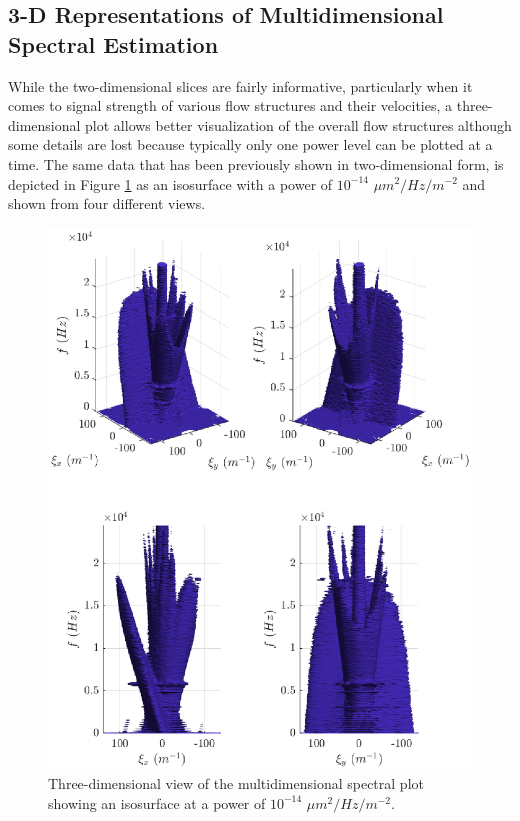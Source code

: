 \subsection{3-D Representations of Multidimensional Spectral Estimation}
While the two-dimensional slices are fairly informative, particularly when it comes to signal strength of various flow structures and their velocities, a three-dimensional plot allows better visualization of the overall flow structures although some details are lost because typically only one power level can be plotted at a time.
The same data that has been previously shown in two-dimensional form, is depicted in Figure \ref{fig:04_dispersion_3d} as an isosurface with a power of $10^{-14}$ $\mu m^2/Hz/m^{-2}$ and shown from four different views.
\begin{figure}
  \centering
  \includegraphics{../matlab/04_dispersion_analysis/dispersion_3d.eps}
  \caption{Three-dimensional view of the multidimensional spectral plot showing an isosurface at a power of $10^{-14}$ $\mu m^2/Hz/m^{-2}$.}
  \label{fig:04_dispersion_3d}
\end{figure}
